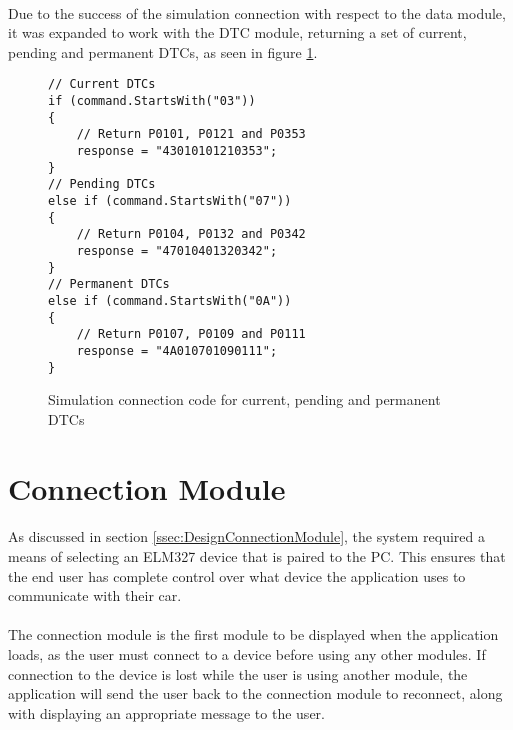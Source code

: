 {		\paragraph{}{
		Due to the success of the simulation connection with respect to the data module, it was expanded to work with the DTC module, returning a set of current, pending and permanent DTCs, as seen in figure \ref{code:SimConnectionDTC}.
		}
	\newpage	
		\begin{figure}[h]
			\begin{lstlisting}
// Current DTCs
if (command.StartsWith("03"))
{
	// Return P0101, P0121 and P0353	
	response = "43010101210353";
}
// Pending DTCs
else if (command.StartsWith("07"))
{
	// Return P0104, P0132 and P0342	
	response = "47010401320342";
}
// Permanent DTCs
else if (command.StartsWith("0A"))
{
	// Return P0107, P0109 and P0111	
	response = "4A010701090111";
}			
			\end{lstlisting}
			\caption{Simulation connection code for current, pending and permanent DTCs}
			\label{code:SimConnectionDTC}
		\end{figure}


\section{Connection Module}
		\paragraph{}{
		As discussed in section \ref{ssec:DesignConnectionModule}, the system required a means of selecting an ELM327 device that is paired to the PC. This ensures that the end user has complete control over what device the application uses to communicate with their car.
		}
		
		\paragraph{}{
		The connection module is the first module to be displayed when  the application loads, as the user must connect to a device before using any other modules. If connection to the device is lost while the user is using another module, the application will send the user back to the connection module to reconnect, along with displaying an appropriate message to the user.
		}
		
}
